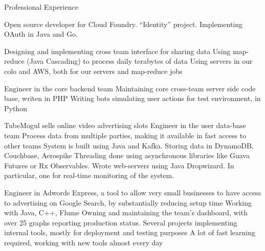 \begin{rubric}{\color{ForestGreen} Professional Experience}

   Open source developer
  for Cloud Foundry.
   ``Identity'' project. Implementing OAuth in Java and Go.

   Designing and implementing cross team interface for sharing data
  Using map-reduce (Java Cascading) to process daily terabytes of data
  Using servers in our colo and AWS, both for our servers and map-reduce jobs


  Engineer in the core backend team
  Maintaining core cross-team server side code base, writen in PHP
  Writing bots simulating user actions for test environment, in Python


   TubeMogul sells online video advertising slots
  Engineer in the user data-base team
  Process data from multiple parties, making it
available in fast access to other teams
  System is built using Java and Kafka. Storing data in DynamoDB, Couchbase,
 Aerospike
 \entry* Threading done using asynchronous libraries like Guava Futures or Rx Observables.
 \entry* Wrote web-servers using Java Dropwizard. In particular, one for real-time monitoring of the system.


  \entry*[\multicolumn{1}{@{}>{\mykeyfont}p{2.5cm}}{%
\color{ForestGreen} {Feb 13 - Sep 14} \newline
\color{NavyBlue} G\color{Red} o\color{YellowOrange} o\color{NavyBlue} g\color{ForestGreen} l\color{Red} e}]
  Engineer in {Adwords Express}, a tool to allow very small businesses to have access to
 advertising on Google Search, by substantially reducing setup time
   Working with Java, C++, Flume
  Owning and maintaining the team's dashboard, with over 25 graphs reporting production status.
 \entry* Several projects implementing internal tools, mostly for deployment and testing purposes
 \entry* A lot of fast learning required, working with new tools almost every day



\end{rubric}
